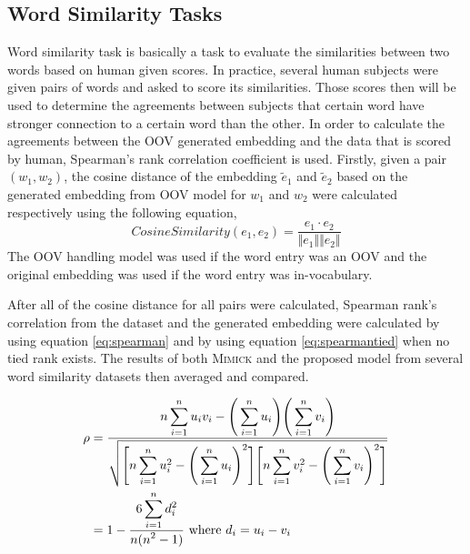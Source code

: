     \subsection{Word Similarity Tasks}
        Word similarity task is basically a task to evaluate the
        similarities between two words based on human given scores. In
        practice, several human subjects were given pairs of words and
        asked to score its similarities. Those scores then will be
        used to determine the agreements between subjects that certain
        word have stronger connection to a certain word than the
        other. In order to calculate the agreements between the OOV
        generated embedding and the data that is scored by human,
        Spearman's rank correlation coefficient is used. Firstly,
        given a pair $(w_1, w_2)$, the cosine distance of the
        embedding $\tilde{e}_1$ and $\tilde{e}_2$ based on the
        generated embedding from OOV model for $w_1$ and $w_2$ were
        calculated respectively using the following equation,
        \begin{equation}
            \label{eq:cosinesim}
            CosineSimilarity(e_1, e_2) = \frac{e_1 \cdot e_2}{\Vert e_1 \Vert \Vert e_2 \Vert}
        \end{equation}
        The OOV handling model was used if the word entry was an OOV and 
        the original embedding was used if the word entry was in-vocabulary.

        After all of the cosine distance for all pairs were calculated,
        Spearman rank's correlation from the dataset and the generated
        embedding were calculated by using equation \ref{eq:spearman}
        and by using equation \ref{eq:spearmantied} when no tied rank
        exists. The results of both \textsc{Mimick} and the proposed
        model from several word similarity datasets then averaged and
        compared.
        
        \begin{align}
            \label{eq:spearman}
            \rho    &= \frac{\displaystyle n\sum_{i=1}^n u_i v_i - \Bigg( \sum_{i=1}^n u_i \Bigg) \Bigg( \sum_{i=1}^n v_i \Bigg)}{\displaystyle \sqrt{\Bigg[ n \sum_{i=1}^n u_i^2 - \Bigg( \sum_{i=1}^n u_i \Bigg)^2 \Bigg] \Bigg[ n \sum_{i=1}^n v_i^2 - \Bigg( \sum_{i=1}^n v_i \Bigg)^2 \Bigg] }}\\
            \label{eq:spearmantied}            
                    &= 1 - \frac{\displaystyle 6 \sum_{i=1}^n d_i^2}{\displaystyle n(n^2 - 1)}\ \text{where}\ d_i = u_i - v_i
        \end{align}
